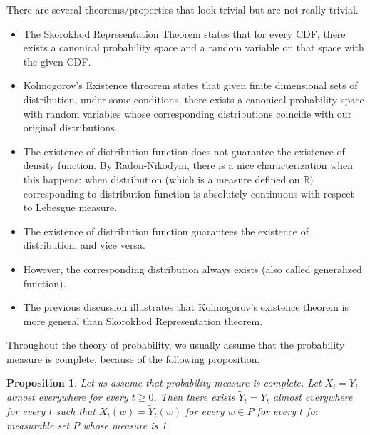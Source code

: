 \documentclass[11pt,reqno]{amsart}
\newtheorem{proposition}[theorem]{Proposition}
\theoremstyle{remark}
\begin{document}
There are several theorems/properties that look trivial but are not really trivial.
\begin{itemize}
\item The Skorokhod Representation Theorem 
    states that for every CDF, there exists a canonical probability space and a random variable on that space with the given CDF.
\item Kolmogorov's Existence threorem states that given finite dimensional sets of distribution, under some conditions, there exists a canonical probability space with random variables whose 
corresponding distributions coincide with our original distributions.
\item The existence of distribution function does not guarantee the existence of density function. By Radon-Nikodym, there is a nice characterization when this happens: when distribution (which is a measure defined on $\mathbb{R})$ corresponding to distribution function is absolutely continuous with respect to
 Lebesgue measure.
\item The existence of distribution function guarantees the existence of distribution, and vice versa.
\item However, the corresponding distribution always exists (also called generalized function). 
\item The previous discussion illustrates that Kolmogorov's existence theorem is more general than Skorokhod Representation theorem.
\end{itemize}
Throughout the theory of probability, we usually assume that the probability measure is complete, because of the following proposition.
\begin{proposition}
    Let us assume that probability measure is complete. Let $X_t=Y_t$ almost everywhere for every $t\geq 0$.
    Then there exists $\tilde{Y}_t=Y_t$ almost everywhere for every $t$ such that $X_t(w)=\tilde{Y}_t(w)$ for every $w\in P$ for every $t$ for 
    measurable set $P$ whose measure is 1.
\end{proposition}
\end{document}
